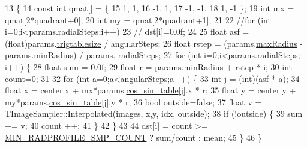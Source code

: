 \begin{DoxyCode}
13 \{
14     \textcolor{keyword}{const} \textcolor{keywordtype}{int} qmat[] = \{
15         1, 1,
16         -1, 1,
17         -1, -1,
18         1, -1 \};
19     \textcolor{keywordtype}{int} mx = qmat[2*quadrant+0];
20     \textcolor{keywordtype}{int} my = qmat[2*quadrant+1];
21 
22     \textcolor{comment}{//for (int i=0;i<params.radialSteps;i++)}
23     \textcolor{comment}{//  dst[i]=0.0f;}
24     
25     \textcolor{keywordtype}{float} asf = (float)params.\hyperlink{struct_q_i_params_a2078879365690b162cac67e45837a29d}{trigtablesize} / angularSteps;
26     \textcolor{keywordtype}{float} rstep = (params.\hyperlink{struct_q_i_params_a59a4abd887cfec3392bb5ecd6891d7d6}{maxRadius} - params.\hyperlink{struct_q_i_params_a4c3b954348ae3ee381eab69122983515}{minRadius}) / params.
      \hyperlink{struct_q_i_params_a19b7d550113364de4e4f11e2c9cfea0e}{radialSteps};
27     \textcolor{keywordflow}{for} (\textcolor{keywordtype}{int} i=0;i<params.\hyperlink{struct_q_i_params_a19b7d550113364de4e4f11e2c9cfea0e}{radialSteps}; i++) \{
28         \textcolor{keywordtype}{float} sum = 0.0f;
29         \textcolor{keywordtype}{float} r = params.\hyperlink{struct_q_i_params_a4c3b954348ae3ee381eab69122983515}{minRadius} + rstep * i;
30         \textcolor{keywordtype}{int} count=0;
31 
32         \textcolor{keywordflow}{for} (\textcolor{keywordtype}{int} a=0;a<angularSteps;a++) \{
33             \textcolor{keywordtype}{int} j = (int)(asf * a);
34             \textcolor{keywordtype}{float} x = center.x + mx*params.\hyperlink{struct_q_i_params_a8da3ccdd4b94c119a0d63ff63f28b8e7}{cos\_sin\_table}[j].x * r;
35             \textcolor{keywordtype}{float} y = center.y + my*params.\hyperlink{struct_q_i_params_a8da3ccdd4b94c119a0d63ff63f28b8e7}{cos\_sin\_table}[j].y * r;
36             \textcolor{keywordtype}{bool} outside=\textcolor{keyword}{false};
37             \textcolor{keywordtype}{float} v = TImageSampler::Interpolated(images, x,y, idx, outside);
38             \textcolor{keywordflow}{if} (!outside) \{
39                 sum += v;
40                 count ++;
41             \}
42         \}
43 
44         dst[i] = count >= \hyperlink{_queued_tracker_8h_a1625167c310599739f4d73170413e64a}{MIN\_RADPROFILE\_SMP\_COUNT} ? sum/count : mean;
45     \}
46 \}
\end{DoxyCode}

